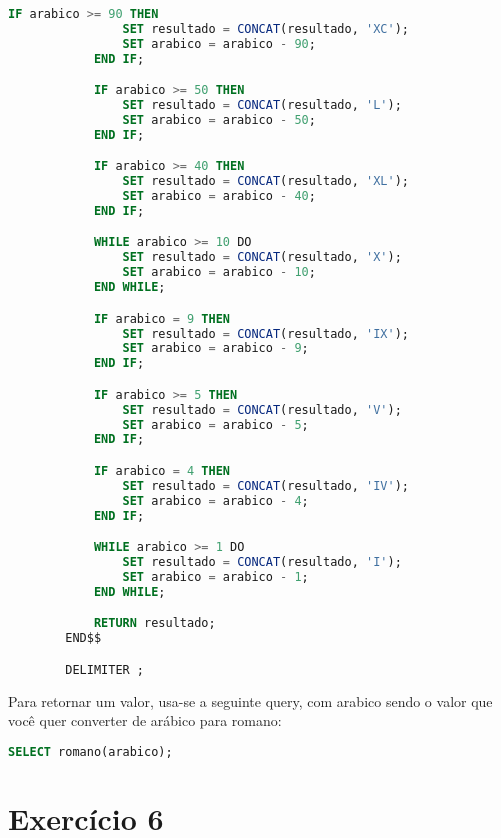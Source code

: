 \documentclass{article}
\begin{document}
\begin{enumerate}[label=\alph*)]
\begin{lstlisting}[language=SQL]
            IF arabico >= 90 THEN
                SET resultado = CONCAT(resultado, 'XC');
                SET arabico = arabico - 90;
            END IF;

            IF arabico >= 50 THEN
                SET resultado = CONCAT(resultado, 'L');
                SET arabico = arabico - 50;
            END IF;

            IF arabico >= 40 THEN
                SET resultado = CONCAT(resultado, 'XL');
                SET arabico = arabico - 40;
            END IF;

            WHILE arabico >= 10 DO
                SET resultado = CONCAT(resultado, 'X');
                SET arabico = arabico - 10;
            END WHILE;

            IF arabico = 9 THEN
                SET resultado = CONCAT(resultado, 'IX');
                SET arabico = arabico - 9;
            END IF;

            IF arabico >= 5 THEN
                SET resultado = CONCAT(resultado, 'V');
                SET arabico = arabico - 5;
            END IF;

            IF arabico = 4 THEN
                SET resultado = CONCAT(resultado, 'IV');
                SET arabico = arabico - 4;
            END IF;

            WHILE arabico >= 1 DO
                SET resultado = CONCAT(resultado, 'I');
                SET arabico = arabico - 1;
            END WHILE;

            RETURN resultado;
        END$$

        DELIMITER ;
    \end{lstlisting}

    Para retornar um valor, usa-se a seguinte query, com arabico sendo o valor que você quer converter de arábico para romano:

    \begin{lstlisting}[language=SQL]
        SELECT romano(arabico);
    \end{lstlisting}

\end{enumerate}

\section*{Exercício 6}
\end{document}
